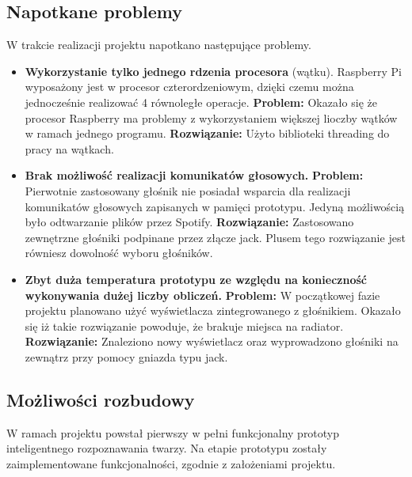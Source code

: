 \documentclass[a4paper,12pt,reqno]{article}
\begin{document}
\subsection{Napotkane problemy}
W trakcie realizacji projektu napotkano następujące problemy.
\begin{itemize}
	\item \textbf{Wykorzystanie tylko jednego rdzenia procesora} (wątku). Raspberry Pi wyposażony jest w procesor czterordzeniowym, dzięki czemu można jednocześnie realizować 4 równoległe operacje. \newline \textbf{Problem:} \newline Okazało się że procesor Raspberry ma problemy z wykorzystaniem większej lioczby wątków w ramach jednego programu. \newline \textbf{Rozwiązanie:} \newline Użyto biblioteki threading do pracy na wątkach.
	\item \textbf{Brak możliwość realizacji komunikatów głosowych.} \newline \textbf{Problem:} \newline Pierwotnie zastosowany głośnik nie posiadał wsparcia dla realizacji komunikatów głosowych zapisanych w pamięci prototypu. Jedyną możliwością było odtwarzanie plików przez Spotify. \newline \textbf{Rozwiązanie:} \newline Zastosowano zewnętrzne głośniki podpinane przez złącze jack. Plusem tego rozwiązanie jest równiesz dowolność wyboru głośników.
	\item \textbf{Zbyt duża temperatura prototypu ze względu na konieczność wykonywania dużej liczby obliczeń.} \newline \textbf{Problem:} \newline W początkowej fazie projektu planowano użyć wyświetlacza zintegrowanego z głośnikiem. Okazało się iż takie rozwiązanie powoduje, że brakuje miejsca na radiator. \newline \textbf{Rozwiązanie:} \newline Znaleziono nowy wyświetlacz oraz wyprowadzono głośniki na zewnątrz przy pomocy gniazda typu jack.
\end{itemize}

\subsection{Możliwości rozbudowy}
W ramach projektu powstał pierwszy w pełni funkcjonalny prototyp inteligentnego rozpoznawania twarzy. Na etapie prototypu zostały zaimplementowane funkcjonalności, zgodnie z założeniami projektu.
\end{document}
